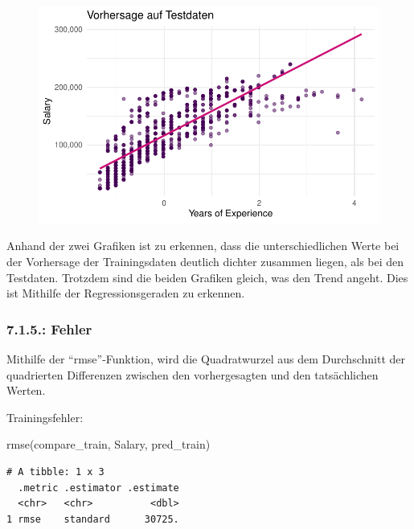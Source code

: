 \documentclass[
  letterpaper,
  DIV=11,
  numbers=noendperiod]{scrartcl}
\newenvironment{Shaded}{\begin{snugshade}}{\end{snugshade}}
\newcommand{\FunctionTok}[1]{\textcolor[rgb]{0.28,0.35,0.67}{#1}}
\newcommand{\NormalTok}[1]{\textcolor[rgb]{0.00,0.23,0.31}{#1}}
\begin{document}
\begin{figure}[H]

{\centering \includegraphics{main_doc_files/figure-pdf/unnamed-chunk-112-2.pdf}

}

\end{figure}

Anhand der zwei Grafiken ist zu erkennen, dass die unterschiedlichen
Werte bei der Vorhersage der Trainingsdaten deutlich dichter zusammen
liegen, als bei den Testdaten. Trotzdem sind die beiden Grafiken gleich,
was den Trend angeht. Dies ist Mithilfe der Regressionsgeraden zu
erkennen.

\hypertarget{fehler}{%
\subsubsection{7.1.5.: Fehler}\label{fehler}}

Mithilfe der ``rmse''-Funktion, wird die Quadratwurzel aus dem
Durchschnitt der quadrierten Differenzen zwischen den vorhergesagten und
den tatsächlichen Werten.

Trainingsfehler:

\begin{Shaded}
\begin{Highlighting}[]
\FunctionTok{rmse}\NormalTok{(compare\_train, Salary, pred\_train)}
\end{Highlighting}
\end{Shaded}

\begin{verbatim}
# A tibble: 1 x 3
  .metric .estimator .estimate
  <chr>   <chr>          <dbl>
1 rmse    standard      30725.
\end{verbatim}
\end{document}
